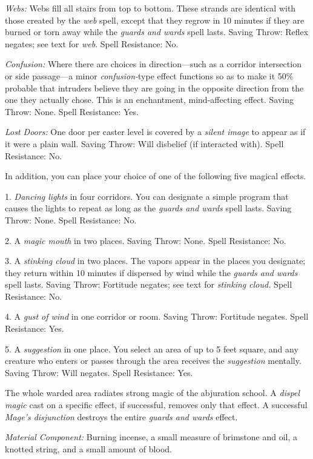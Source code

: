 \documentclass{article}
\begin{document}
\textit{Webs: }Webs fill all stairs from top to bottom. These strands are identical 
with those created by the \textit{web }spell, except that they regrow in 10 minutes 
if they are burned or torn away while the \textit{guards and wards }spell lasts. 
Saving Throw: Reflex negates; see text for \textit{web}. Spell Resistance: No.

\textit{Confusion: }Where there are choices in direction---such as a corridor intersection 
or side passage---a minor \textit{confusion-}type effect functions so as to make 
it 50\% probable that intruders believe they are going in the opposite direction 
from the one they actually chose. This is an enchantment, mind-affecting effect. 
Saving Throw: None. Spell Resistance: Yes.

\textit{Lost Doors: }One door per caster level is covered by a \textit{silent image 
}to appear as if it were a plain wall. Saving Throw: Will disbelief (if interacted 
with). Spell Resistance: No.

In addition, you can place your choice of one of the following five magical effects.

1. \textit{Dancing lights }in four corridors. You can designate a simple program 
that causes the lights to repeat as long as the \textit{guards and wards }spell 
lasts. Saving Throw: None. Spell Resistance: No.

2. A \textit{magic mouth }in two places. Saving Throw: None. Spell Resistance: 
No.

3. A \textit{stinking cloud }in two places. The vapors appear in the places you 
designate; they return within 10 minutes if dispersed by wind while the \textit{guards 
and wards }spell lasts. Saving Throw: Fortitude negates; see text for \textit{stinking 
cloud. }Spell Resistance: No.

4. A \textit{gust of wind }in one corridor or room. Saving Throw: Fortitude negates. 
Spell Resistance: Yes.

5. A \textit{suggestion }in one place. You select an area of up to 5 feet square, 
and any creature who enters or passes through the area receives the \textit{suggestion 
}mentally. Saving Throw: Will negates. Spell Resistance: Yes.

The whole warded area radiates strong magic of the abjuration school. A \textit{dispel 
magic }cast on a specific effect, if successful, removes only that effect. A successful 
\textit{Mage's disjunction }destroys the entire \textit{guards and wards }effect.

\textit{Material Component: }Burning incense, a small measure of brimstone and 
oil, a knotted string, and a small amount of blood.
\end{document}
